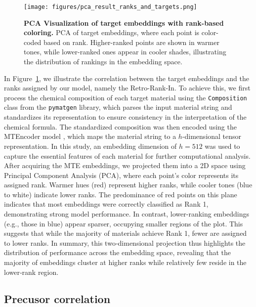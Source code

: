 \begin{figure}%
    \centering
        \centering
        \texttt{[image: figures/pca\_result\_ranks\_and\_targets.png]}
        \caption{\textbf{PCA Visualization of target embeddings with rank-based coloring.} 
        PCA of target embeddings, where each point is color-coded based on rank. Higher-ranked points are shown in warmer tones, while lower-ranked ones appear in cooler shades, illustrating the distribution of rankings in the embedding space.}
        \label{tab:pca_dec}
\end{figure}


In Figure~\ref{tab:pca_dec}, we illustrate the correlation between the target embeddings and the ranks assigned by our model, namely the Retro-Rank-In. To achieve this, we first process the chemical composition of each target material using the \texttt{Composition} class from the \texttt{pymatgen} library, which parses the input material string and standardizes its representation to ensure consistency in the interpretation of the chemical formula. The standardized composition was then encoded using the MTEncoder model \cite{prein2023mtencoder}, which maps the material string to a $h$-dimensional tensor representation. In this study, an embedding dimension of $h=512$ was used to capture the essential features of each material for further computational analysis. After acquiring the MTE embeddings, we projected them into a 2D space using Principal Component Analysis (PCA), where each point's color represents its assigned rank. Warmer hues (red) represent higher ranks, while cooler tones (blue to white) indicate lower ranks. The predominance of red points on this plane indicates that most embeddings were correctly classified as Rank 1, demonstrating strong model performance. In contrast, lower-ranking embeddings (e.g., those in blue) appear sparser, occupying smaller regions of the plot. This suggests that while the majority of materials achieve Rank 1, fewer are assigned to lower ranks. In summary, this two‐dimensional projection thus highlights the distribution of performance across the embedding space, revealing that the majority of embeddings cluster at higher ranks while relatively few reside in the lower‐rank region.


\subsection{Precusor correlation}

